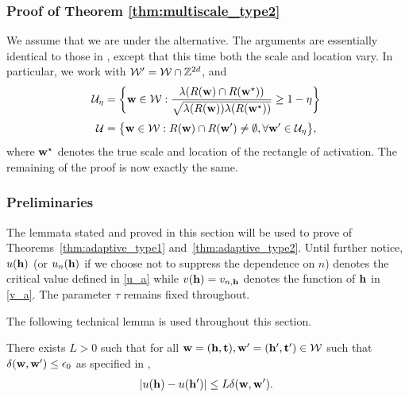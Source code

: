 \documentclass[twoside,11pt]{article}
\begin{document}
\subsubsection{Proof of Theorem \ref{thm:multiscale_type2}}
\label{sec:proof_multiscale_type2}
We assume that we are under the alternative.
The arguments are essentially identical to those in , except that this time both the scale and location vary.  In particular, we work with $\mathcal{W}' = \mathcal{W} \cap \mathbb{Z}^{2d}$, and 
\[
\mathcal{U}_\eta = \bigg\{\mathbf{w} \in \mathcal{W} : \frac{\lambda(R(\mathbf{w}) \cap R(\mathbf{w}^\star))}{\sqrt{\lambda(R(\mathbf{w}))\lambda(R(\mathbf{w}^\star))}} \ge 1 - \eta \bigg\}
\]
\[
\mathcal{U} = \big\{\mathbf{w} \in \mathcal{W}: R(\mathbf{w}) \cap R(\mathbf{w}') \neq \emptyset, \forall \mathbf{w}' \in \mathcal{U}_\eta \big\},
\]
where $\mathbf{w}^\star$ denotes the true scale and location of the rectangle of activation.  The remaining of the proof is now exactly the same.  

\subsubsection{Preliminaries}
The lemmata stated and proved in this section will be used to prove of Theorems~\ref{thm:adaptive_type1} and~\ref{thm:adaptive_type2}.
Until further notice, $u(\mathbf{h})$ (or $u_n(\mathbf{h})$ if we choose not to suppress the dependence on $n$) denotes the critical value defined in \eqref{u_a} while $v(\mathbf{h}) = v_{n,\mathbf{h}}$ denotes the function of $\mathbf{h}$ in \eqref{v_a}.
The parameter $\tau$ remains fixed throughout.

The following technical lemma is used throughout this section.
\begin{lemma}
\label{lem:ua_lipschitz}
There exists $L > 0$ such that for all $\mathbf{w} = (\mathbf{h},\mathbf{t}), \mathbf{w}' = (\mathbf{h}',\mathbf{t}') \in \mathcal{W}$ such that $\delta(\mathbf{w},\mathbf{w}') \le \epsilon_0$ as specified in , 
\[
|u(\mathbf{h}) - u(\mathbf{h}')| \le L \delta(\mathbf{w},\mathbf{w}').
\]
\end{lemma}
\end{document}
